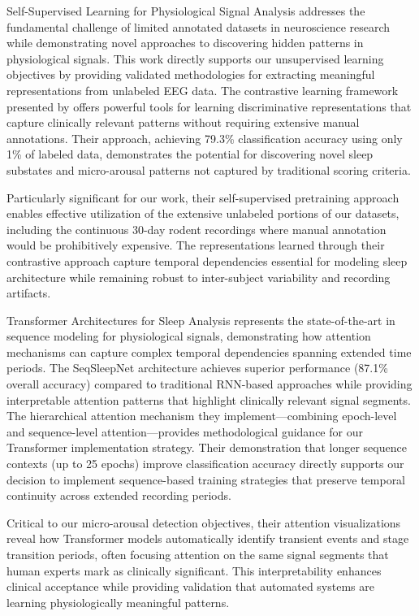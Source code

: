 \documentclass[a4paper,12pt,twoside]{article}
\begin{document}
Self-Supervised Learning for Physiological Signal Analysis \cite{banville2021uncovering} addresses the fundamental challenge of limited annotated datasets in neuroscience research while demonstrating novel approaches to discovering hidden patterns in physiological signals. This work directly supports our unsupervised learning objectives by providing validated methodologies for extracting meaningful representations from unlabeled EEG data. The contrastive learning framework presented by \citeauthor{banville2021uncovering} offers powerful tools for learning discriminative representations that capture clinically relevant patterns without requiring extensive manual annotations. Their approach, achieving 79.3\% classification accuracy using only 1\% of labeled data, demonstrates the potential for discovering novel sleep substates and micro-arousal patterns not captured by traditional scoring criteria.

Particularly significant for our work, their self-supervised pretraining approach enables effective utilization of the extensive unlabeled portions of our datasets, including the continuous 30-day rodent recordings where manual annotation would be prohibitively expensive. The representations learned through their contrastive approach capture temporal dependencies essential for modeling sleep architecture while remaining robust to inter-subject variability and recording artifacts.

Transformer Architectures for Sleep Analysis \cite{phan2019sleeptransformer} represents the state-of-the-art in sequence modeling for physiological signals, demonstrating how attention mechanisms can capture complex temporal dependencies spanning extended time periods. The SeqSleepNet architecture achieves superior performance (87.1\% overall accuracy) compared to traditional RNN-based approaches while providing interpretable attention patterns that highlight clinically relevant signal segments. The hierarchical attention mechanism they implement—combining epoch-level and sequence-level attention—provides methodological guidance for our Transformer implementation strategy. Their demonstration that longer sequence contexts (up to 25 epochs) improve classification accuracy directly supports our decision to implement sequence-based training strategies that preserve temporal continuity across extended recording periods.



Critical to our micro-arousal detection objectives, their attention visualizations reveal how Transformer models automatically identify transient events and stage transition periods, often focusing attention on the same signal segments that human experts mark as clinically significant. This interpretability enhances clinical acceptance while providing validation that automated systems are learning physiologically meaningful patterns.
\end{document}
